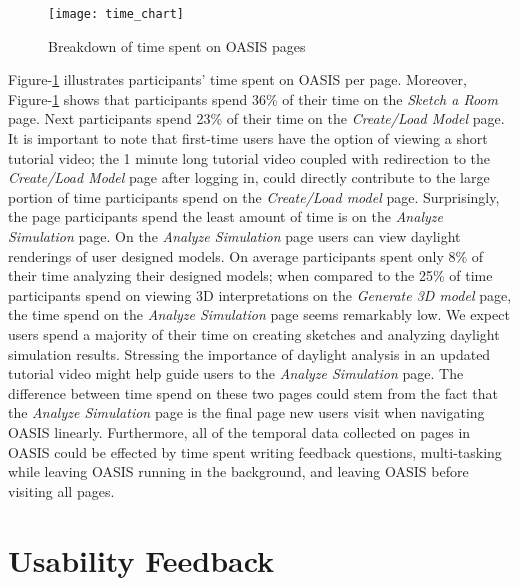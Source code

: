 \begin{figure}[!ht]
	\centering
	\texttt{[image: time\_chart]}
	\caption{Breakdown of time spent on OASIS pages}
	\label{fig:time_chart}
\end{figure}

Figure-\ref{fig:time_chart} illustrates participants' time spent on OASIS per page.
Moreover, Figure-\ref{fig:time_chart} shows that participants spend 36\% of their time on the \textit{ Sketch a Room} page.
Next participants spend 23\% of their time on the \textit{Create/Load Model} page.
It is important to note that first-time users have the option of viewing a short tutorial video; 
the 1 minute long tutorial video coupled with redirection to the \textit{Create/Load Model} page after logging in, could directly contribute to the large portion of time participants spend on the \textit{Create/Load model} page.
Surprisingly, the page participants spend the least amount of time is on the \textit{Analyze Simulation} page. 
On the \textit{Analyze Simulation} page users can view daylight renderings of user designed models.
On average participants spent only 8\% of their time analyzing their designed models;
when compared to the 25\% of time participants spend on viewing 3D interpretations on the \textit{Generate 3D model} page, the time spend on the \textit{Analyze Simulation} page seems remarkably low.
We expect users spend a majority of their time on creating sketches and analyzing daylight simulation results.
Stressing the importance of daylight analysis in an updated tutorial video might help guide users to the \textit{Analyze Simulation} page.
The difference between time spend on these two pages could stem from the fact that the \textit{Analyze Simulation} page is the final page new users visit when navigating OASIS linearly.
Furthermore, all of the temporal data collected on pages in OASIS could be effected by time spent writing feedback questions, multi-tasking while leaving OASIS running in the background, and leaving OASIS before visiting all pages.
 
\section{Usability Feedback}


